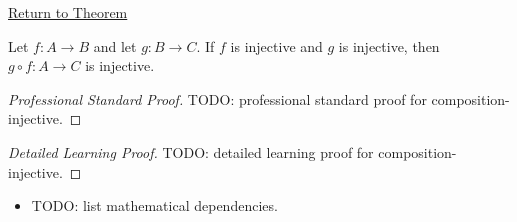 \newpage
{}
\label{prf:composition-injective}

\begin{remark*}[Return]
\hyperref[prop:composition-injective]{Return to Theorem}
\end{remark*}

\begin{proposition*}
Let $f:A\to B$ and let $g:B\to C$. If $f$ is injective and $g$ is
injective, then $g\circ f:A\to C$ is injective.

\smallskip\noindent
\end{proposition*}

\begin{proof}[Professional Standard Proof]
\LRAProofBodyStart
TODO: professional standard proof for composition-injective.
\end{proof}

\begin{proof}[Detailed Learning Proof]
\LRAProofBodyStart
TODO: detailed learning proof for composition-injective.
\end{proof}

\begin{remark*}
\end{remark*}

\begin{dependencies}
\begin{itemize}
  \item TODO: list mathematical dependencies.
\end{itemize}
\end{dependencies}

\clearpage
